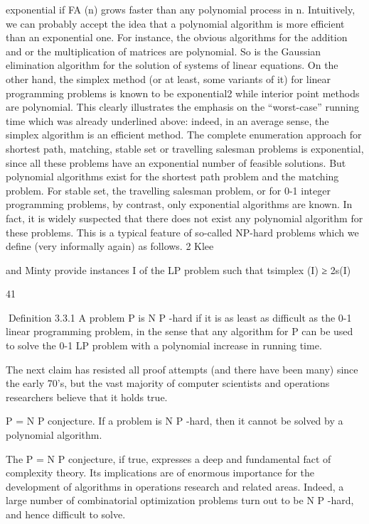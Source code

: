 \documentclass[titlepage]{book}
\theoremstyle{plain}
\theoremstyle{definition}
\theoremstyle{remark}
\begin{document}
exponential if FA (n) grows faster than any polynomial process in n. Intuitively, we can probably accept
the idea that a polynomial algorithm is more efficient than an exponential one.
For instance, the obvious algorithms for the addition and or the multiplication of matrices are polynomial.
So is the Gaussian elimination algorithm for the solution of systems of linear equations. On the other
hand, the simplex method (or at least, some variants of it) for linear programming problems is known to
be exponential2 while interior point methods are polynomial. This clearly illustrates the emphasis on the
“worst-case” running time which was already underlined above: indeed, in an average sense, the simplex
algorithm is an efficient method.
The complete enumeration approach for shortest path, matching, stable set or travelling salesman problems is exponential, since all these problems have an exponential number of feasible solutions. But
polynomial algorithms exist for the shortest path problem and the matching problem.
For stable set, the travelling salesman problem, or for 0-1 integer programming problems, by contrast,
only exponential algorithms are known. In fact, it is widely suspected that there does not exist any
polynomial algorithm for these problems. This is a typical feature of so-called NP-hard problems which
we define (very informally again) as follows.
2 Klee

and Minty provide instances I of the LP problem such that tsimplex (I) ≥ 2s(I)

41

Definition 3.3.1 A problem P is N P -hard if it is as least as difficult as the 0-1 linear programming
problem, in the sense that any algorithm for P can be used to solve the 0-1 LP problem with a polynomial
increase in running time.

The next claim has resisted all proof attempts (and there have been many) since the early 70's, but the
vast majority of computer scientists and operations researchers believe that it holds true.

P = N P conjecture. If a problem is N P -hard, then it cannot be solved by a polynomial algorithm.

The P = N P conjecture, if true, expresses a deep and fundamental fact of complexity theory. Its
implications are of enormous importance for the development of algorithms in operations research and
related areas. Indeed, a large number of combinatorial optimization problems turn out to be N P -hard,
and hence difficult to solve.
\end{document}
